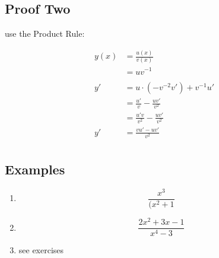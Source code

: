 \documentclass[letterpaper, landscape]{exam}
\begin{document}
  \subsection{Proof Two} %
  
  use the Product Rule:

  \begin{align*}
    y(x) & = \frac{u(x)}{v(x)} \\
         & = u v^{-1} \\
    \\
    y'   & = u \cdot \left( -v^{-2} v' \right) + v^{-1} u' \\
         & = \frac{u'}{v} - \frac{uv'}{v^2} \\
         & = \frac{u'v}{v^2} - \frac{uv'}{v^2} \\
    y'   & = \frac{vu' - uv'}{v^2} \\
  \end{align*}

  \subsection{Examples} %
  
  \begin{enumerate}
    \item 
      \[
        \frac{x^3}{(x^2 + 1} 
      \]

    \item 
      \[
        \frac{2x^2 + 3x - 1}{x^4 - 3}
      \]

    \item see exercises

  \end{enumerate}
\end{document}
